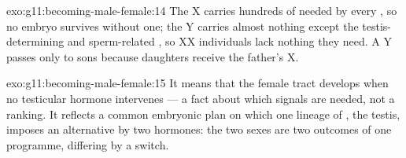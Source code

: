 \begin{solution}{exo:g11:becoming-male-female:14}
The X carries hundreds of  needed by every , so no embryo
survives without one; the Y carries almost nothing except the
testis-determining and sperm-related , so XX individuals lack
nothing they need. A Y passes only to sons because daughters receive
the father's X.
\end{solution}

\begin{solution}{exo:g11:becoming-male-female:15}
It means that the female tract develops when no testicular hormone
intervenes --- a fact about which signals are needed, not a ranking.
It reflects a common embryonic plan on which one lineage of ,
the testis, imposes an alternative by two hormones: the two sexes are
two outcomes of one programme, differing by a switch.
\end{solution}

